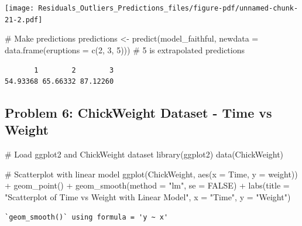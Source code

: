 \documentclass[
  letterpaper,
  DIV=11,
  numbers=noendperiod]{scrreprt}
\newenvironment{Shaded}{\begin{snugshade}}{\end{snugshade}}
\newcommand{\AttributeTok}[1]{\textcolor[rgb]{0.40,0.45,0.13}{#1}}
\newcommand{\CommentTok}[1]{\textcolor[rgb]{0.37,0.37,0.37}{#1}}
\newcommand{\ConstantTok}[1]{\textcolor[rgb]{0.56,0.35,0.01}{#1}}
\newcommand{\DecValTok}[1]{\textcolor[rgb]{0.68,0.00,0.00}{#1}}
\newcommand{\FunctionTok}[1]{\textcolor[rgb]{0.28,0.35,0.67}{#1}}
\newcommand{\NormalTok}[1]{\textcolor[rgb]{0.00,0.23,0.31}{#1}}
\newcommand{\OtherTok}[1]{\textcolor[rgb]{0.00,0.23,0.31}{#1}}
\newcommand{\SpecialCharTok}[1]{\textcolor[rgb]{0.37,0.37,0.37}{#1}}
\newcommand{\StringTok}[1]{\textcolor[rgb]{0.13,0.47,0.30}{#1}}
\begin{document}
\texttt{[image: Residuals\_Outliers\_Predictions\_files/figure-pdf/unnamed-chunk-21-2.pdf]}

\begin{Shaded}
\begin{Highlighting}[]
\CommentTok{\# Make predictions}
\NormalTok{predictions }\OtherTok{\textless{}{-}} \FunctionTok{predict}\NormalTok{(model\_faithful, }\AttributeTok{newdata =} \FunctionTok{data.frame}\NormalTok{(}\AttributeTok{eruptions =} \FunctionTok{c}\NormalTok{(}\DecValTok{2}\NormalTok{, }\DecValTok{3}\NormalTok{, }\DecValTok{5}\NormalTok{))) }\CommentTok{\# 5 is extrapolated}
\NormalTok{predictions}
\end{Highlighting}
\end{Shaded}

\begin{verbatim}
       1        2        3 
54.93368 65.66332 87.12260 
\end{verbatim}

\subsection*{Problem 6: ChickWeight Dataset - Time vs
Weight}\label{problem-6-chickweight-dataset---time-vs-weight-2}

\begin{Shaded}
\begin{Highlighting}[]
\CommentTok{\# Load ggplot2 and ChickWeight dataset}
\FunctionTok{library}\NormalTok{(ggplot2)}
\FunctionTok{data}\NormalTok{(ChickWeight)}

\CommentTok{\# Scatterplot with linear model}
\FunctionTok{ggplot}\NormalTok{(ChickWeight, }\FunctionTok{aes}\NormalTok{(}\AttributeTok{x =}\NormalTok{ Time, }\AttributeTok{y =}\NormalTok{ weight)) }\SpecialCharTok{+}
  \FunctionTok{geom\_point}\NormalTok{() }\SpecialCharTok{+}
  \FunctionTok{geom\_smooth}\NormalTok{(}\AttributeTok{method =} \StringTok{"lm"}\NormalTok{, }\AttributeTok{se =} \ConstantTok{FALSE}\NormalTok{) }\SpecialCharTok{+}
  \FunctionTok{labs}\NormalTok{(}\AttributeTok{title =} \StringTok{"Scatterplot of Time vs Weight with Linear Model"}\NormalTok{, }\AttributeTok{x =} \StringTok{"Time"}\NormalTok{, }\AttributeTok{y =} \StringTok{"Weight"}\NormalTok{)}
\end{Highlighting}
\end{Shaded}

\begin{verbatim}
`geom_smooth()` using formula = 'y ~ x'
\end{verbatim}
\end{document}
